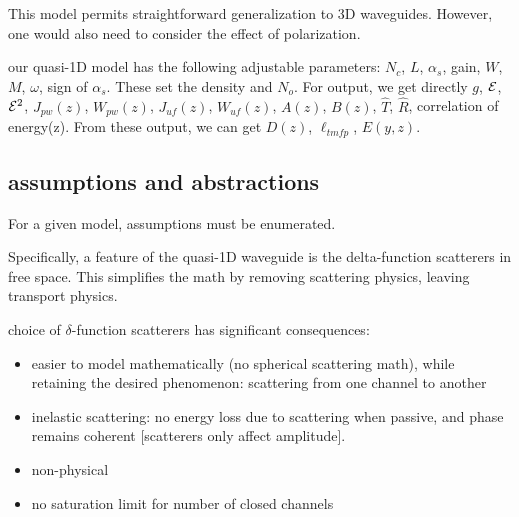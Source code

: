 This model permits straightforward generalization to 3D waveguides. However, one would also need to consider the effect of polarization. %

our quasi-1D model  has the following adjustable parameters: $N_c$, $L$, $\alpha_s$, gain, $W$, $M$, $\omega$, sign of $\alpha_s$. These set the density and $N_o$. For output, we get directly $g$, ${\cal E}$, ${\cal E}^2$, $J_{pw}(z)$, $W_{pw}(z)$, $J_{uf}(z)$, $W_{uf}(z)$, $A(z)$, $B(z)$, $\hat{T}$, $\hat{R}$, correlation of energy(z). From these output, we can get $D(z)$, $\ell_{tmfp}$, $E(y,z)$. 

\subsection{assumptions and abstractions}

For a given model, assumptions must be enumerated.



Specifically, a feature of the quasi-1D waveguide is the delta-function scatterers in free space. This simplifies the math by removing scattering physics, leaving transport physics.

choice of $\delta$-function scatterers has significant consequences:
\begin{itemize}
 \item easier to model mathematically (no spherical scattering math), while retaining the desired phenomenon: scattering from one channel to another
 \item inelastic scattering: no energy loss due to scattering when passive, and phase remains coherent [scatterers only affect amplitude].
 \item non-physical
 \item no saturation limit for number of closed channels
\end{itemize}

